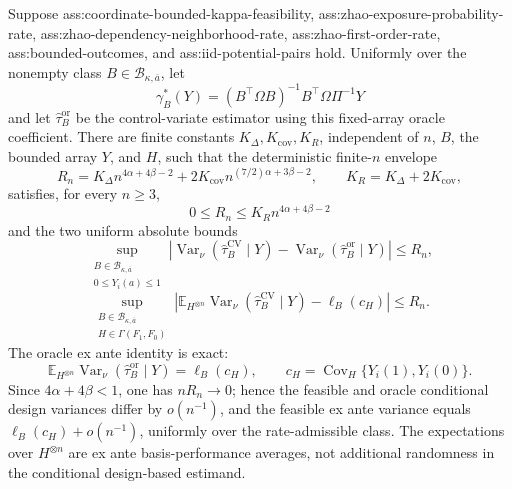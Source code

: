Suppose ass:coordinate-bounded-kappa-feasibility, ass:zhao-exposure-probability-rate, ass:zhao-dependency-neighborhood-rate, ass:zhao-first-order-rate, ass:bounded-outcomes, and ass:iid-potential-pairs hold.  Uniformly over the nonempty class \(B\in\mathcal B_{\kappa,\overline a}\), let
\[
\gamma_B^*(Y)=(B^{\top}\Omega B)^{-1}B^{\top}\Omega\Pi^{-1}Y
\]
and let \(\widehat\tau_B^{\mathrm{or}}\) be the control-variate estimator using this fixed-array oracle coefficient.  There are finite constants \(K_\Delta,K_{\mathrm{cov}},K_R\), independent of \(n\), \(B\), the bounded array \(Y\), and \(H\), such that the deterministic finite-\(n\) envelope
\[
R_n=K_\Delta n^{4\alpha+4\beta-2}
+2K_{\mathrm{cov}}n^{(7/2)\alpha+3\beta-2},
\qquad K_R=K_\Delta+2K_{\mathrm{cov}},
\]
satisfies, for every \(n\ge3\),
\[
0\le R_n\le K_Rn^{4\alpha+4\beta-2}
\]
and the two uniform absolute bounds
\[
\sup_{\substack{B\in\mathcal B_{\kappa,\overline a}\\0\le Y_i(a)\le1}}
\left|
\operatorname{Var}_\nu(\widehat\tau_B^{\mathrm{CV}}\mid Y)
-\operatorname{Var}_\nu(\widehat\tau_B^{\mathrm{or}}\mid Y)
\right|
\le R_n,
\]
\[
\sup_{\substack{B\in\mathcal B_{\kappa,\overline a}\\H\in\Gamma(F_1,F_0)}}
\left|
\mathbb E_{H^{\otimes n}}
\operatorname{Var}_\nu(\widehat\tau_B^{\mathrm{CV}}\mid Y)
-\ell_B(c_H)
\right|
\le R_n.
\]
The oracle ex ante identity is exact:
\[
\mathbb E_{H^{\otimes n}}
\operatorname{Var}_\nu(\widehat\tau_B^{\mathrm{or}}\mid Y)
=\ell_B(c_H),
\qquad
c_H=\operatorname{Cov}_H\{Y_i(1),Y_i(0)\}.
\]
Since \(4\alpha+4\beta<1\), one has \(nR_n\to0\); hence the feasible and oracle conditional design variances differ by \(o(n^{-1})\), and the feasible ex ante variance equals \(\ell_B(c_H)+o(n^{-1})\), uniformly over the rate-admissible class.  The expectations over \(H^{\otimes n}\) are ex ante basis-performance averages, not additional randomness in the conditional design-based estimand.